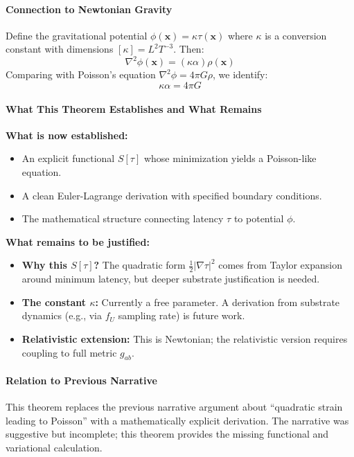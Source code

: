 \paragraph{Connection to Newtonian Gravity}
Define the gravitational potential $\phi(\mathbf{x}) = \kappa \tau(\mathbf{x})$ where $\kappa$ is a conversion constant with dimensions $[\kappa] = L^2 T^{-3}$. Then:
\[
\nabla^2 \phi(\mathbf{x}) = (\kappa \alpha) \rho(\mathbf{x})
\]
Comparing with Poisson's equation $\nabla^2 \phi = 4\pi G \rho$, we identify:
\[
\kappa \alpha = 4\pi G
\]

\paragraph{What This Theorem Establishes and What Remains}
\begin{tcolorbox}[colback=green!5!white,colframe=green!75!black,title=Status: Complete Toy Model Derivation]
\textbf{What is now established:}
\begin{itemize}
    \item An explicit functional $S[\tau]$ whose minimization yields a Poisson-like equation.
    \item A clean Euler-Lagrange derivation with specified boundary conditions.
    \item The mathematical structure connecting latency $\tau$ to potential $\phi$.
\end{itemize}

\textbf{What remains to be justified:}
\begin{itemize}
    \item \textbf{Why this $S[\tau]$?} The quadratic form $\frac{1}{2}|\nabla\tau|^2$ comes from Taylor expansion around minimum latency, but deeper substrate justification is needed.
    \item \textbf{The constant $\kappa$:} Currently a free parameter. A derivation from substrate dynamics (e.g., via $f_U$ sampling rate) is future work.
    \item \textbf{Relativistic extension:} This is Newtonian; the relativistic version requires coupling to full metric $g_{ab}$.
\end{itemize}
\end{tcolorbox}

\paragraph{Relation to Previous Narrative}
This theorem replaces the previous narrative argument about ``quadratic strain leading to Poisson'' with a mathematically explicit derivation. The narrative was suggestive but incomplete; this theorem provides the missing functional and variational calculation.
